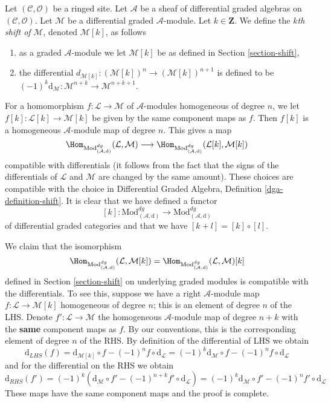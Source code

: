 \noindent
Let $(\mathcal{C}, \mathcal{O})$ be a ringed site.
Let $\mathcal{A}$ be a sheaf of differential graded algebras
on $(\mathcal{C}, \mathcal{O})$.
Let $\mathcal{M}$ be a differential graded $\mathcal{A}$-module.
Let $k \in \mathbf{Z}$. We define the {\it $k$th shift of} $\mathcal{M}$,
denoted $\mathcal{M}[k]$, as follows
\begin{enumerate}
\item as a graded $\mathcal{A}$-module we let $\mathcal{M}[k]$ be
as defined in Section \ref{section-shift},
\item the differential
$d_{\mathcal{M}[k]} : (\mathcal{M}[k])^n \to (\mathcal{M}[k])^{n + 1}$
is defined to be
$(-1)^k\text{d}_\mathcal{M} : \mathcal{M}^{n + k} \to \mathcal{M}^{n + k + 1}$.
\end{enumerate}
For a homomorphism $f : \mathcal{L} \to \mathcal{M}$ of $\mathcal{A}$-modules
homogeneous of degree $n$, we let $f[k] : \mathcal{L}[k] \to \mathcal{M}[k]$
be given by the same component maps as $f$. Then $f[k]$ is
a homogeneous $\mathcal{A}$-module map of degree $n$.
This gives a map
$$
\Hom_{\text{Mod}^{dg}_{(\mathcal{A}, \text{d})}}(\mathcal{L}, \mathcal{M})
\longrightarrow
\Hom_{\text{Mod}^{dg}_{(\mathcal{A}, \text{d})}}
(\mathcal{L}[k], \mathcal{M}[k])
$$
compatible with differentials (it follows from the fact
that the signs of the differentials of $\mathcal{L}$ and
$\mathcal{M}$ are changed by the same amount). These choices are
compatible with the choice in
Differential Graded Algebra, Definition \ref{dga-definition-shift}.
It is clear that we have defined a functor
$$
[k] :
\text{Mod}^{dg}_{(\mathcal{A}, \text{d})}
\longrightarrow
\text{Mod}^{dg}_{(\mathcal{A}, \text{d})}
$$
of differential graded categories and that we have
$[k + l] = [k] \circ [l]$.

\medskip\noindent
We claim that the isomorphism
$$
\Hom_{\text{Mod}^{dg}_{(\mathcal{A}, \text{d})}}(\mathcal{L}, \mathcal{M}[k])
=
\Hom_{\text{Mod}^{dg}_{(\mathcal{A}, \text{d})}}(\mathcal{L}, \mathcal{M})[k]
$$
defined in Section \ref{section-shift} on underlying graded modules
is compatible with
the differentials. To see this, suppose we have a right $\mathcal{A}$-module
map $f : \mathcal{L} \to \mathcal{M}[k]$ homogeneous of degree $n$; this
is an element of degree $n$ of the LHS. Denote
$f' : \mathcal{L} \to \mathcal{M}$ the homogeneous $\mathcal{A}$-module
map of degree $n + k$ with the {\bf same} component maps as $f$.
By our conventions, this is the corresponding element of degree $n$
of the RHS.
By definition of the differential of LHS we obtain
$$
\text{d}_{LHS}(f) =
\text{d}_{\mathcal{M}[k]} \circ f - (-1)^n f \circ \text{d}_\mathcal{L} =
(-1)^k\text{d}_\mathcal{M} \circ f - (-1)^n f \circ \text{d}_\mathcal{L}
$$
and for the differential on the RHS we obtain
$$
\text{d}_{RHS}(f') =
(-1)^k\left(
\text{d}_\mathcal{M} \circ f' - (-1)^{n + k} f' \circ \text{d}_\mathcal{L}
\right) =
(-1)^k\text{d}_\mathcal{M} \circ f' - (-1)^n f' \circ \text{d}_\mathcal{L}
$$
These maps have the same component maps and the proof is complete.









